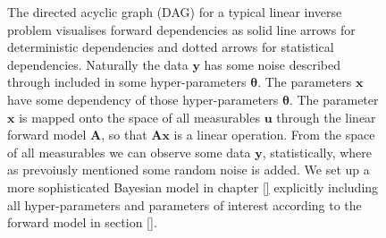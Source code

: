 \begin{figure}[ht!]
	\centering

	\caption[Bayesian Inference DAG]{The directed acyclic graph (DAG) for a typical linear inverse problem visualises forward dependencies as solid line arrows for deterministic dependencies and dotted arrows for statistical dependencies.
	Naturally the data $\bm{y}$ has some noise described through included in some hyper-parameters $\bm{\theta}$.
	The parameters $\bm{x}$ have some dependency of those hyper-parameters $\bm{\theta}$. The parameter $\bm{x}$ is mapped onto the space of all measurables $\bm{u}$ through the linear forward model $\bm{A}$, so that $\bm{Ax}$ is a linear operation.
	From the space of all measurables we can observe some data $\bm{y}$, statistically, where as prevoiusly mentioned some random noise is added.
	We set up a more sophisticated Bayesian model in chapter \ref{} explicitly including all hyper-parameters and parameters of interest according to the forward model in section \ref{}.}
	\label{fig:FirstDAG}
\end{figure}



